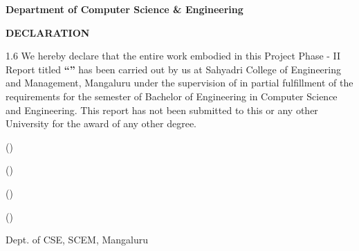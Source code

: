 \clearpage
\thispagestyle{empty}
\begin{center}
{\large\bfseries Department of Computer Science \& Engineering}

\vspace{2.5em}
{\Large\bfseries DECLARATION}
\end{center}

\vspace{1.5em}
\begin{spacing}{1.6}
We hereby declare that the entire work embodied in this Project Phase - II Report titled \textbf{``\ProjectTitle''} has been carried out by us at Sahyadri College of Engineering and Management, Mangaluru under the supervision of \textbf{\GuideName} in partial fulfillment of the requirements for the \Semester{} semester of Bachelor of Engineering in Computer Science and Engineering. This report has not been submitted to this or any other University for the award of any other degree.
\end{spacing}

\vspace{5em}
\noindent\StudentA{} (\UsnA)

\vspace{1.5em}
\noindent\StudentB{} (\UsnB)

\vspace{1.5em}
\noindent\StudentC{} (\UsnC)

\vspace{1.5em}
\noindent\StudentD{} (\UsnD)

\vspace{3em}
\noindent Dept. of CSE, SCEM, Mangaluru
\clearpage
